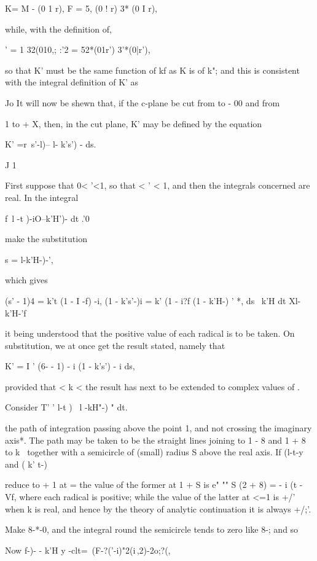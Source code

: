 K= M - (0 1 r), F = 5, (0 ! r) 3* (0 I r),

while, with the definition of,

 ' = 1 32(010,; :'2 = 52*(01r') 3'*(0|r'),

so that K' must be the same function of kf as K is of k"; and this is
consistent with the integral definition of K' as

Jo It will now be shewn that, if the c-plane be cut from to - 00 and
from

1 to + X, then, in the cut plane, K' may be defined by the equation

K' =r\ s'-l)-- l- k's') - ds.

J 1

First suppose that 0< '<1, so that < ' < 1, and then the integrals
concerned are real. In the integral

f\ l -t )-iO--k'H')- dt .'0

make the substitution

s = l-k'H-)-',

which gives

(s' - 1)4 = k't (1 - I -f) -i, (1 - k's'-)i = k' (1 - i?f (1 - k'H-) '
*, ds \ k'H dt Xl-k'H-'f

it being understood that the positive value of each radical is to be
taken. On substitution, we at once get the result stated, namely that

K' = I ' (6- - 1) - i (1 - k's') - i ds,

provided that < k <\; the result has next to be extended to complex
values of .

%
%

Consider T' ' l-t )~ l -kH"-) " dt.

the path of integration passing above the point 1, and not crossing
the imaginary axis*. The path may be taken to be the straight lines
joining to 1 - 8 and 1 + 8 to k~ together with a semicircle of (small)
radius S above the real axis. If (l-t-y and ( k' t-)

reduce to + 1 at = the value of the former at 1 + S is e" "" S (2 + 8)
= - i (t - Vf, where each radical is positive; while the value of the
latter at <=1 is +/' when k is real, and hence by the theory of
analytic continuation it is always +/;'.

Make 8-*-0, and the integral round the semicircle tends to zero like
8-; and so

Now f-)- - k'H y -clt=\ (F-?('-i)"2(i\,,2)-2o;?(,

